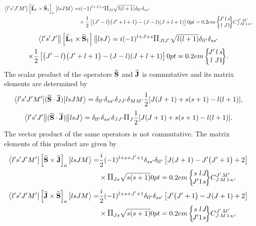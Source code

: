\begin{align}
\braOket{l^{\prime} s^{\prime} J^{\prime} M^{\prime}}{\left[\widehat{\vect{L}}_{1} \times \widehat{\vect{S}}_{1}\right]_{\kappa}}{l s J M}=&i(-1)^{l+J+s} \Fact{J l} \sqrt{ l(l+1)} \delta_{l l^{\prime}} \delta_{s s^{\prime}} \notag\\
& \times \frac{1}{2}\left[\bigl(J^{\prime}-l\bigr)\bigl(J^{\prime}+l+1\bigr)-(J-l)(J+l+1)\right]
\sixj{J^{\prime}}{l}{s}{l}{J}{1}
\clebsch{J}{M}{1}{\kappa}{J^{\prime}}{M^{\prime}} , \label{eq:13:2:171}
\end{align}
\begin{multline*}
\braOketred{l^{\prime} s^{\prime} J^{\prime}}{\left[\widehat{\vect{L}}_{1} \times \widehat{\vect{S}}_{1}\right]}{l s J}=i(-1)^{l+J+s} \Fact{J l J^{\prime}} \sqrt{ l(l+1)} \delta_{l l^{\prime}} \delta_{s s^{\prime}} \\
\times \frac{1}{2}\left[\bigl(J^{\prime}-l\bigr)\bigl(J^{\prime}+l+1\bigr)-(J-l)(J+l+1)\right]
\sixj{J^{\prime}}{l}{s}{l}{J}{1}.
\end{multline*}
The scalar product of the operators \(\widehat{\mathbf{S}}\) and \(\widehat{\mathbf{J}}\) is commutative and its matrix elements are determined by
\begin{equation}
\bigl\langle l^{\prime} s^{\prime} J^{\prime} M^{\prime} \big| (\widehat{\mathbf{S}} \cdot \widehat{\mathbf{J}}) \big|  l s J M \bigr\rangle=\delta_{l l^{\prime}} \delta_{s s^{\prime}} \delta_{J J^{\prime}} \delta_{M M^{\prime}} \frac{1}{2}[J(J+1)+s(s+1)-l(l+1)], \label{eq:13:2:172}
\end{equation}
\begin{equation*}
\braOketred{l^{\prime} s^{\prime} J^{\prime}}{(\widehat{\vect{S}} \cdot \widehat{\vect{J}})}{ l s J}=\delta_{l l^{\prime}} \delta_{s s^{\prime}} \delta_{J J^{\prime}} \Fact{J} \frac{1}{2}[J(J+1)+s(s+1)-l(l+1)].
\end{equation*}
The vector product of the same operators is not commutative. The matrix elements of this product are given by
\begin{align}
\braOket{ l^{\prime} s^{\prime} J^{\prime} M^{\prime}}{\left[\widehat{\vect{S}} \times \widehat{\vect{J}}\right]_{\kappa}}{l s J M}=&\frac{i}{2}(-1)^{l+s+J^{\prime}+1} \delta_{s s^{\prime}} \delta_{l l^{\prime}}\left[J(J+1)-J^{\prime}\bigl(J^{\prime}+1\bigr)+2\right] \notag\\
&\times \Fact{J s}\sqrt{ s(s+1)}
\sixj{s}{l}{J}{J^{\prime}}{1}{s} 
\clebsch{J}{M}{1}{\kappa}{J^{\prime}}{M^{\prime}},  \label{eq:13:2:173}\\
\braOket{ l^{\prime} s^{\prime} J^{\prime} M^{\prime} }{ \left[\widehat{\vect{J}} \times \widehat{\vect{S}}\right]_{\kappa}}{l s J M}=&\frac{i}{2}(-1)^{l+s+J^{\prime}+1} \delta_{l l^{\prime}} \delta_{s s^{\prime}}\left[J^{\prime}\bigl(J^{\prime}+1\bigr)-J(J+1)+2\right] \notag\\
&\times \Fact{J s}\sqrt{ s(s+1)}
\sixj{s}{l}{J}{J^{\prime}}{1}{s} 
\clebsch{J}{M}{1}{\kappa}{J^{\prime}}{M^{\prime}}, \label{eq:13:2:174}
\end{align}
